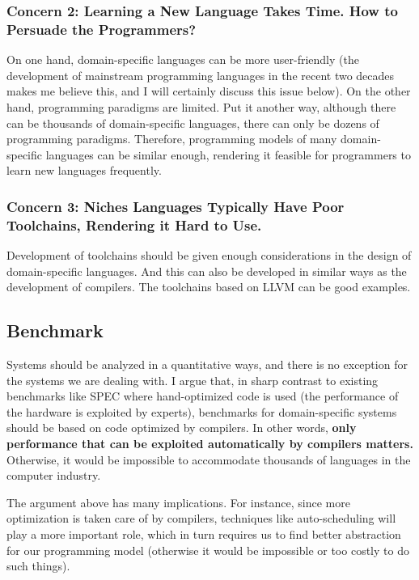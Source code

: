 \documentclass[11pt]{article}
\begin{document}
\subsubsection*{Concern 2: Learning a New Language Takes Time. How to Persuade the Programmers?}
On one hand, domain-specific languages can be more user-friendly (the development of mainstream programming languages in the recent two decades makes me believe this, and I will certainly discuss this issue below).
On the other hand, programming paradigms are limited.
Put it another way, although there can be thousands of domain-specific languages, there can only be dozens of programming paradigms.
Therefore, programming models of many domain-specific languages can be similar enough, rendering it feasible for programmers to learn new languages frequently.

\subsubsection*{Concern 3: Niches Languages Typically Have Poor Toolchains, Rendering it Hard to Use.}
Development of toolchains should be given enough considerations in the design of domain-specific languages.
And this can also be developed in similar ways as the development of compilers.
The toolchains based on LLVM can be good examples.

\subsection{Benchmark}
Systems should be analyzed in a quantitative ways, and there is no exception for the systems we are dealing with.
I argue that, in sharp contrast to existing benchmarks like SPEC where hand-optimized code is used (the performance of the hardware is exploited by experts), benchmarks for domain-specific systems should be based on code optimized by compilers.
In other words, \textbf{only performance that can be exploited automatically by compilers matters.}
Otherwise, it would be impossible to accommodate thousands of languages in the computer industry.

The argument above has many implications.
For instance, since more optimization is taken care of by compilers, techniques like auto-scheduling will play a more important role, which in turn requires us to find better abstraction for our programming model (otherwise it would be impossible or too costly to do such things).
\end{document}
